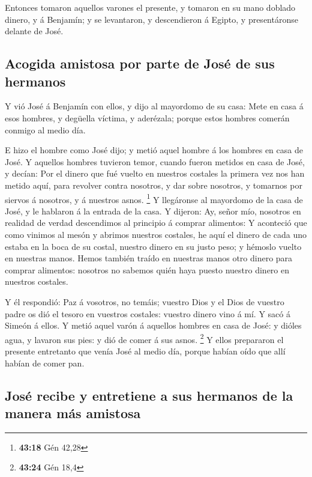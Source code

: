  Entonces tomaron aquellos varones el presente, y tomaron
en su mano doblado dinero, y á Benjamín; y se levantaron, y descendieron
á Egipto, y presentáronse delante de José.

\hypertarget{acogida-amistosa-por-parte-de-josuxe9-de-sus-hermanos}{%
\subsection{Acogida amistosa por parte de José de sus
hermanos}\label{acogida-amistosa-por-parte-de-josuxe9-de-sus-hermanos}}

 Y vió José á Benjamín con ellos, y dijo al mayordomo de
su casa: Mete en casa á esos hombres, y degüella víctima, y aderézala;
porque estos hombres comerán conmigo al medio día.

 E hizo el hombre como José dijo; y metió aquel hombre á
los hombres en casa de José.  Y aquellos hombres tuvieron
temor, cuando fueron metidos en casa de José, y decían: Por el dinero
que fué vuelto en nuestros costales la primera vez nos han metido aquí,
para revolver contra nosotros, y dar sobre nosotros, y tomarnos por
siervos á nosotros, y á nuestros asnos. \footnote{\textbf{43:18} Gén
  42,28}  Y llegáronse al mayordomo de la casa de José, y
le hablaron á la entrada de la casa.  Y dijeron: Ay,
señor mío, nosotros en realidad de verdad descendimos al principio á
comprar alimentos:  Y aconteció que como vinimos al mesón
y abrimos nuestros costales, he aquí el dinero de cada uno estaba en la
boca de su costal, nuestro dinero en su justo peso; y hémoslo vuelto en
nuestras manos.  Hemos también traído en nuestras manos
otro dinero para comprar alimentos: nosotros no sabemos quién haya
puesto nuestro dinero en nuestros costales.

 Y él respondió: Paz á vosotros, no temáis; vuestro Dios
y el Dios de vuestro padre os dió el tesoro en vuestros costales:
vuestro dinero vino á mí. Y sacó á Simeón á ellos.  Y
metió aquel varón á aquellos hombres en casa de José: y dióles agua, y
lavaron sus pies: y dió de comer á sus asnos. \footnote{\textbf{43:24}
  Gén 18,4}  Y ellos prepararon el presente entretanto
que venía José al medio día, porque habían oído que allí habían de comer
pan.

\hypertarget{josuxe9-recibe-y-entretiene-a-sus-hermanos-de-la-manera-muxe1s-amistosa}{%
\subsection{José recibe y entretiene a sus hermanos de la manera más
amistosa}\label{josuxe9-recibe-y-entretiene-a-sus-hermanos-de-la-manera-muxe1s-amistosa}}

